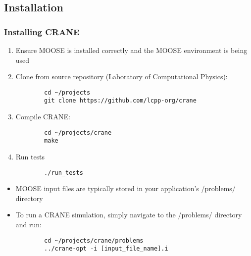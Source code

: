 \subsection{Installation}
\begin{frame}[fragile]
	\frametitle{Installing CRANE}
	\begin{enumerate}
		\item Ensure MOOSE is installed correctly and the MOOSE environment is being used
		\item Clone from source repository (Laboratory of Computational Physics): 
		\begin{verbatim}
		cd ~/projects
		git clone https://github.com/lcpp-org/crane
		\end{verbatim}
		\item Compile CRANE:
		\begin{verbatim}
		cd ~/projects/crane
		make
		\end{verbatim}
		\item Run tests
		\begin{verbatim}
		./run_tests
		\end{verbatim}
	\end{enumerate}
\end{frame}

\begin{frame}[fragile]
	\begin{itemize}
		\item MOOSE input files are typically stored in your application's /problems/ directory
		\item To run a CRANE simulation, simply navigate to the /problems/ directory and run: 
		\begin{verbatim}
		cd ~/projects/crane/problems
		../crane-opt -i [input_file_name].i
		\end{verbatim}
	\end{itemize}
\end{frame}